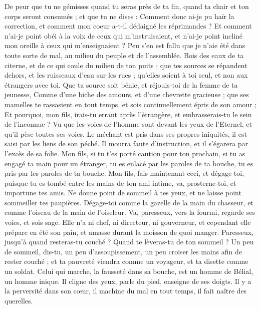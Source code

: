\begin{multicols}{2}
De peur que tu ne gémisses quand tu seras près de ta fin, quand ta chair et ton corps seront consumés ;
et que tu ne dises : Comment donc ai-je pu haïr la correction, et comment mon coeur a-t-il dédaigné les réprimandes ?
Et comment n’ai-je point obéi à la voix de ceux qui m’instruisaient, et n’ai-je point incliné mon oreille à ceux qui m’enseignaient ?
Peu s'en est fallu que je n'aie été dans toute sorte de mal, au milieu du peuple et de l'assemblée.
Bois des eaux de ta citerne, et de ce qui coule du milieu de ton puits ;
que tes sources se répandent dehors, et les ruisseaux d'eau sur les rues ;
qu’elles soient à toi seul, et non aux étrangers avec toi.
Que ta source soit bénie, et réjouis-toi de la femme de ta jeunesse,
Comme d'une biche des amours, et d’une chevrette gracieuse ; que ses mamelles te rassasient en tout temps, et sois continuellement épris de son amour ;
Et pourquoi, mon fils, irais-tu errant après l’étrangère, et embrasserais-tu le sein de l'inconnue ?
Vu que les voies de l’homme sont devant les yeux de l’Eternel, et qu’il pèse toutes ses voies.
Le méchant est pris dans ses propres iniquités, il est saisi par les liens de son péché.
Il mourra faute d'instruction, et il s’égarera  par l’excès de sa folie.
\VerseOne{}Mon fils, si tu t’es porté caution pour ton prochain, si tu as engagé ta main pour un étranger,
tu es enlacé par les paroles de ta bouche, tu es pris par les paroles de ta bouche.
Mon fils, fais maintenant ceci, et dégage-toi, puisque tu es tombé entre les mains de ton ami intime, va, prosterne-toi, et importune tes amis.
Ne donne point de sommeil à tes yeux, et ne laisse point sommeiller tes paupières.
Dégage-toi comme la gazelle de la main du chasseur, et comme l'oiseau de la main de l'oiseleur.
Va, paresseux, vers la fourmi, regarde ses voies, et sois sage.
Elle n'a ni chef, ni directeur, ni gouverneur,
et cependant elle prépare en été son pain, et amasse durant la moisson de quoi manger.
Paresseux, jusqu'à quand resteras-tu couché ? Quand te lèveras-tu de ton sommeil ?
Un peu de sommeil, dis-tu, un peu d’assoupissement, un peu croiser les mains afin de rester couché ;
et ta pauvreté viendra comme un voyageur, et ta disette comme un soldat.
Celui qui marche, la fausseté dans sa bouche, est un homme de Bélial, un homme inique.
Il cligne des yeux, parle du pied, enseigne de ses doigts.
Il y a la perversité dans son cœur, il machine du mal en tout temps, il fait naître des querelles.

\end{multicols}
